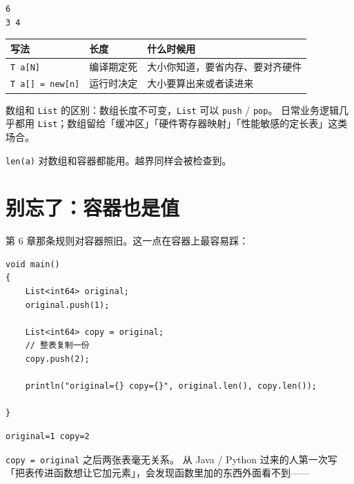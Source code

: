 \par
\medskip
\begin{lstlisting}[style=out]
6
3 4
\end{lstlisting}
\par
\medskip

\begin{center}
\begin{tabular}{lll}
\toprule
写法 & 长度 & 什么时候用 \\
\midrule
\texttt{T a[\allowbreak{}N]\allowbreak{}} & 编译期定死 & 大小你知道，要省内存、要对齐硬件 \\
\texttt{T a[\allowbreak{}]\allowbreak{} =\allowbreak{} new[\allowbreak{}n]\allowbreak{}} & 运行时决定 & 大小要算出来或者读进来 \\
\bottomrule
\end{tabular}
\end{center}

数组和 \texttt{List} 的区别：数组长度不可变，\texttt{List} 可以 \texttt{push} / \texttt{pop}。 日常业务逻辑几乎都用 \texttt{List}；数组留给「缓冲区」「硬件寄存器映射」「性能敏感的定长表」这类场合。

\texttt{len(\allowbreak{}a)\allowbreak{}} 对数组和容器都能用。越界同样会被检查到。

\section{别忘了：容器也是值}

第 6 章那条规则对容器照旧。这一点在容器上最容易踩：

\par
\medskip
\begin{lstlisting}[style=chali]
void main()
{
    List<int64> original;
    original.push(1);

    List<int64> copy = original;
    // 整表复制一份
    copy.push(2);

    println("original={} copy={}", original.len(), copy.len());

}
\end{lstlisting}
\par
\medskip

\par
\medskip
\begin{lstlisting}[style=out]
original=1 copy=2
\end{lstlisting}
\par
\medskip

\texttt{copy =\allowbreak{} original} 之后两张表毫无关系。 从 Java / Python 过来的人第一次写「把表传进函数想让它加元素」，会发现函数里加的东西外面看不到——

